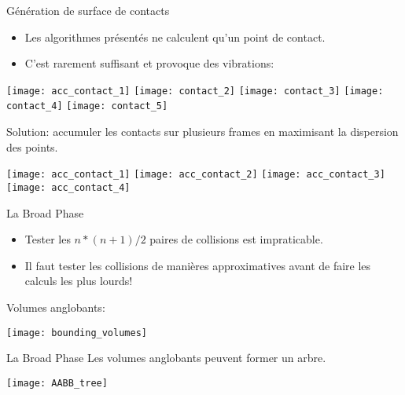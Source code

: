 \begin{frame}{Génération de surface de contacts}
    \begin{itemize}
        \item Les algorithmes présentés ne calculent qu’un point de contact.
        \item C’est rarement suffisant et provoque des vibrations:
    \end{itemize}
    \begin{center}
        \texttt{[image: acc\_contact\_1]}
        \pause
        \texttt{[image: contact\_2]}
        \pause
        \texttt{[image: contact\_3]}
        \pause
        \texttt{[image: contact\_4]}
        \pause
        \texttt{[image: contact\_5]}
        \pause
    \end{center}

    Solution: accumuler les contacts sur plusieurs frames en maximisant la
    dispersion des points.
    \pause
    \begin{center}
        \texttt{[image: acc\_contact\_1]}
        \pause
        \texttt{[image: acc\_contact\_2]}
        \pause
        \texttt{[image: acc\_contact\_3]}
        \pause
        \texttt{[image: acc\_contact\_4]}
    \end{center}
\end{frame}

\begin{frame}{La Broad Phase}
    \begin{itemize}
        \item Tester les $n * (n + 1) / 2$ paires de collisions est impraticable.
        \item Il faut tester les collisions de manières approximatives avant de
            faire les calculs les plus lourds!
    \end{itemize}
    \pause
    \begin{description}
        \item[Volumes anglobants:]
    \end{description}
    \begin{center}
        \texttt{[image: bounding\_volumes]}
    \end{center}
\end{frame}

\begin{frame}{La Broad Phase}
    Les volumes anglobants peuvent former un arbre.
    \begin{center}
            \texttt{[image: AABB\_tree]}
    \end{center}
\end{frame}

